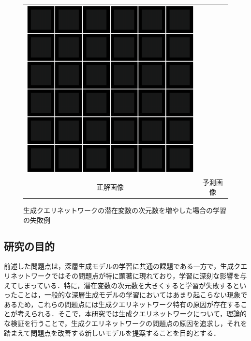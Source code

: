 \begin{figure}[tbp]
\begin{center}
\begin{tabular}{cc}
\begin{minipage}{0.5\linewidth}
\begin{center}
          \includegraphics[width=\linewidth]{./figures/gqn_failure.png}
        \end{center}
      \end{minipage}
      \\
      正解画像&予測画像\\
      \end{tabular}
    \caption{生成クエリネットワークの潜在変数の次元数を増やした場合の学習の失敗例}
    \label{fig:gqn_failure}
  \end{center}
\end{figure}

\subsection{研究の目的}
前述した問題点は，深層生成モデルの学習に共通の課題である一方で，生成クエリネットワークではその問題点が特に顕著に現れており，学習に深刻な影響を与えてしまっている．特に，潜在変数の次元数を大きくすると学習が失敗するといったことは，一般的な深層生成モデルの学習においてはあまり起こらない現象であるため，これらの問題点には生成クエリネットワーク特有の原因が存在することが考えられる．そこで，本研究では生成クエリネットワークについて，理論的な検証を行うことで，生成クエリネットワークの問題点の原因を追求し，それを踏まえて問題点を改善する新しいモデルを提案することを目的とする．

